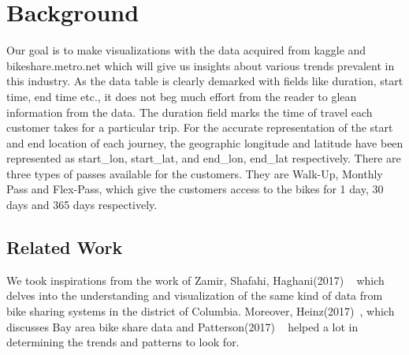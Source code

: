 \section{Background}
\label{sec:background}

Our goal is to make visualizations with the data acquired from kaggle and bikeshare.metro.net which will give us insights about various trends prevalent in this industry. 
As the data table is clearly demarked with fields like duration, start time, end time etc., it does not beg much effort from the reader to glean information from the data. 
The duration field marks the time of travel each customer takes for a particular trip. 
For the accurate representation of the start and end location of each journey, the geographic longitude and latitude have been represented as start_lon, start_lat, and end_lon, end_lat respectively. 
There are three types of passes available for the customers. They are Walk-Up, Monthly Pass and Flex-Pass, which give the customers access to the bikes for 1 day, 30 days and 365 days respectively.  

\subsection{Related Work}
\label{sec:related}

We took inspirations from the work of Zamir, Shafahi, Haghani(2017) ~\cite{Zamir, Shafahi, Haghani:2017: University of Maryland} which delves into the understanding and visualization of the same kind of data from bike sharing systems in the district of Columbia. 
Moreover, Heinz(2017)~\cite{Heinz:2017: NYC Data Science}, which discusses Bay area bike share data and Patterson(2017) ~\cite{Patterson:2017: Urbandatacyclist.wordpress.com} helped a lot in determining the trends and patterns to look for. 
